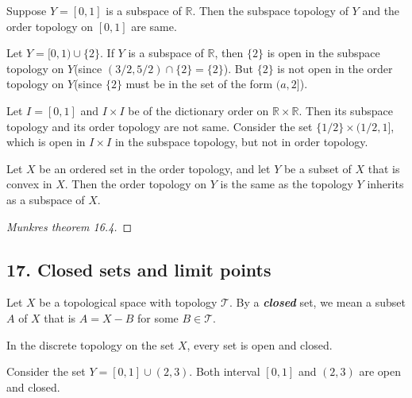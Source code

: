 \begin{example}
Suppose $Y=[0,1]$ is a subspace of $\mathbb{R}$. Then the subspace topology of $Y$ and the order topology on $[0,1]$ are same.
\end{example}
\begin{example}
Let $Y=[0,1)\cup \{2\}$. If $Y$ is a subspace of $\mathbb{R}$, then $\{2\}$ is open in the subspace topology on $Y$(since $(3/2,5/2)\cap \{2\}=\{2\}$). But $\{2\}$ is not open in the order topology on $Y$(since $\{2\}$ must be in the set of the form $(a,2]$).
\end{example}
\begin{example}
Let $I=[0,1]$ and $I\times I$ be of the dictionary order on $\mathbb{R}\times \mathbb{R}$. Then its subspace topology and its order topology are not same. Consider the set $\{1/2\}\times (1/2,1]$, which is open in $I\times I$ in the subspace topology, but not in order topology.
\end{example}

\begin{mytheorem}
Let $X$ be an ordered set in the order topology, and let $Y$ be a subset of $X$ that is convex in $X$. Then the order topology on $Y$ is the same as the topology $Y$ inherits as a subspace of $X$.
\end{mytheorem}
\begin{proof}
[Munkres theorem 16.4]
\end{proof}

\subsection{17. Closed sets and limit points}
\begin{mydefinition}
Let $X$ be a topological space with topology $\mathcal{T}$. By a \textbf{\emph{closed}} set, we mean a subset $A$ of $X$ that is $A=X-B$ for some $B\in \mathcal{T}$.
\end{mydefinition}
\begin{example}
In the discrete topology on the set $X$, every set is open and closed.
\end{example}
\begin{example}
Consider the set $Y=[0,1]\cup (2,3)$. Both interval $[0,1]$ and $(2,3)$ are open and closed.
\end{example}

